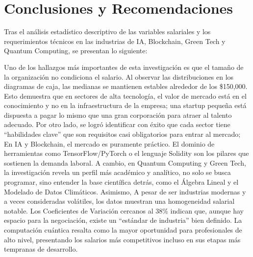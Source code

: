 \documentclass[oneside,11pt]{Latex/Classes/PhDthesisPSnPDF}
\begin{document}
\chapter{Conclusiones y Recomendaciones}

Tras el análisis estadístico descriptivo de las variables salariales y
los requerimientos técnicos en las industrias de IA, Blockchain, Green
Tech y Quantum Computing, se presentan lo siguiente:

Uno de los hallazgos más importantes de esta investigación es que el
tamaño de la organización no condiciona el salario. Al observar las
distribuciones en los diagramas de caja, las medianas se mantienen
estables alrededor de los \$150,000. Esto demuestra que en sectores de
alta tecnología, el valor de mercado está en el conocimiento y no en la
infraestructura de la empresa; una startup pequeña está dispuesta a
pagar lo mismo que una gran corporación para atraer al talento adecuado.
Por otro lado, se logró identificar con éxito que cada sector tiene
``habilidades clave'' que son requisitos casi obligatorios para entrar
al mercado; En IA y Blockchain, el mercado es puramente práctico. El
dominio de herramientas como TensorFlow/PyTorch o el lenguaje Solidity
son los pilares que sostienen la demanda laboral. A cambio, en Quantum
Computing y Green Tech, la investigación revela un perfil más académico
y analítico, no solo se busca programar, sino entender la base
científica detrás, como el Álgebra Lineal y el Modelado de Datos
Climáticos. Asimismo, A pesar de ser industrias modernas y a veces
consideradas volátiles, los datos muestran una homogeneidad salarial
notable. Los Coeficientes de Variación cercanos al 38\% indican que,
aunque hay espacio para la negociación, existe un ``estándar de
industria'' bien definido. La computación cuántica resalta como la mayor
oportunidad para profesionales de alto nivel, presentando los salarios
más competitivos incluso en sus etapas más tempranas de desarrollo.
\end{document}
